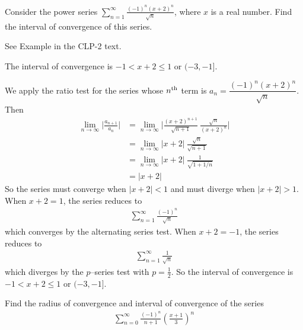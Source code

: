 \begin{question}[2013A]
 Consider the power series
 $\displaystyle\sum\limits_{n=1}^\infty \frac{(-1)^n(x+2)^n}{\sqrt{n}}$,
where $x$ is a real number. Find the interval of
convergence of this series.
\end{question}

\begin{hint}
See Example  in the
CLP-2 text.
\end{hint}

\begin{answer}
The interval of convergence
is $-1<x+2\le 1$ or $(-3,-1]$.
\end{answer}

\begin{solution}
We apply the ratio test for the series whose $n^{\rm th}$
term is $a_n=\dfrac{(-1)^n(x+2)^n}{\sqrt{n}}$. Then
\begin{align*}
\lim_{n\rightarrow\infty}\bigg|\frac{a_{n+1}}{a_n}\bigg|
&=\lim_{n\rightarrow\infty} \bigg|\frac{(x+2)^{n+1}}{\sqrt{n+1}}
                                  \ \frac{\sqrt{n}}{(x+2)^n}\bigg| \\
&=\lim_{n\rightarrow\infty} |x+2|\ \frac{\sqrt{n}}{\sqrt{n+1}} \\
&=\lim_{n\rightarrow\infty} |x+2|\ \frac{1}{\sqrt{1+1/n}} \\
&=|x+2|
\end{align*}
So the series must converge when $|x+2|<1$ and must diverge when $|x+2|>1$.
When $x+2=1$, the series reduces to
\begin{align*}
\sum_{n=1}^\infty \frac{(-1)^n}{\sqrt{n}}
\end{align*}
which converges by the alternating series test.
When $x+2=-1$, the series reduces to
\begin{align*}
\sum_{n=1}^\infty \frac{1}{\sqrt{n}}
\end{align*}
which diverges by the $p$--series test with $p=\frac{1}{2}$.
So the interval of convergence is $-1<x+2\le 1$ or $(-3,-1]$.

\end{solution}

\begin{Mquestion}[2016Q5]
Find the radius of convergence and interval of convergence of the series
\begin{align*}
\sum_{n=0}^{\infty} \frac{(-1)^n}{n+1} \left(\frac{x+1}{3}\right)^n
\end{align*}
\end{Mquestion}

